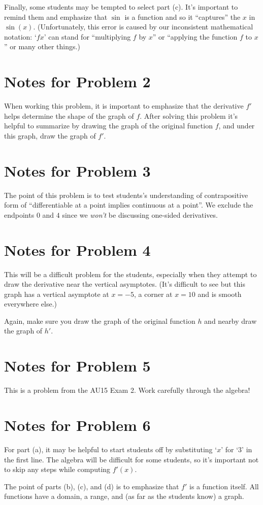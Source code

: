 \documentclass[handout,nooutcomes]{ximera}
\begin{document}
Finally, some students may be tempted to select part (c).
It's important to remind them and emphasize that $\sin$ is a function and so it ``captures'' the $x$ in $\sin(x)$.
(Unfortunately, this error is caused by our inconsistent mathematical notation: `$fx$' can stand for ``multiplying $f$ by $x$'' or ``applying the function $f$ to $x$'' or many other things.)

\section{Notes for Problem 2}
When working this problem, it is important to emphasize that the derivative $f'$ helps determine the shape of the graph of $f$.
After solving this problem it's helpful to summarize by drawing the graph of the original function $f$, and under this graph, draw the graph of $f'$.


\section{Notes for Problem 3}
The point of this problem is to test students's understanding of contrapositive form of ``differentiable at a point implies continuous at a point''.
We exclude the endpoints $0$ and $4$ since we \emph{won't} be discussing one-sided derivatives.

\section{Notes for Problem 4}
This will be a difficult problem for the students, especially when they attempt to draw the derivative near the vertical asymptotes.
(It's difficult to see but this graph has a vertical asymptote at $x = -5$, a corner at $x = 10$ and is smooth everywhere else.)

Again, make sure you draw the graph of the original function $h$ and nearby draw the graph of $h'$.

\section{Notes for Problem 5}
This is a problem from the AU15 Exam 2.
Work carefully through the algebra!

\section{Notes for Problem 6}
For part (a), it may be helpful to start students off by substituting `$x$' for `$3$' in the first line.
The algebra will be difficult for some students, so it's important not to skip any steps while computing $f'(x)$.

The point of parts (b), (c), and (d) is to emphasize that $f'$ is a function itself.
All functions have a domain, a range, and (as far as the students know) a graph.
\end{document}
